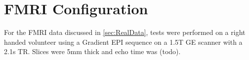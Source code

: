
\section{FMRI Configuration}
For the FMRI data discussed in \autoref{sec:RealData}, tests were 
performed on a right handed volunteer using a Gradient EPI sequence
on a 1.5T GE scanner with a 2.1s TR. Slices were 5mm thick and echo
time was (todo). 


